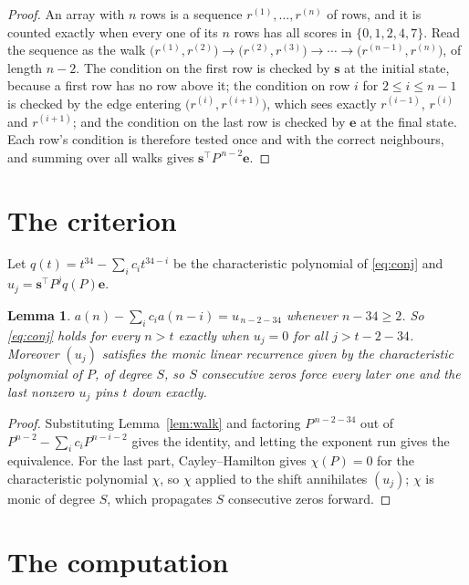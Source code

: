 \documentclass[11pt,a4paper]{article}
\theoremstyle{plain}
\newtheorem{lemma}[theorem]{Lemma}
\theoremstyle{definition}
\begin{document}
\begin{proof}
An array with $n$ rows is a sequence $r^{(1)},\dots,r^{(n)}$ of rows, and it is counted
exactly when every one of its $n$ rows has all scores in $\{0,1,2,4,7\}$. Read the sequence as the
walk $\bigl(r^{(1)},r^{(2)}\bigr)\to\bigl(r^{(2)},r^{(3)}\bigr)\to\cdots\to
\bigl(r^{(n-1)},r^{(n)}\bigr)$, of length $n-2$. The condition on the first row is
checked by $\mathbf{s}$ at the initial state, because a first row has no row above it; the
condition on row $i$ for $2\le i\le n-1$ is checked by the edge entering
$\bigl(r^{(i)},r^{(i+1)}\bigr)$, which sees exactly $r^{(i-1)}$, $r^{(i)}$ and
$r^{(i+1)}$; and the condition on the last row is checked by $\mathbf{e}$ at the final
state. Each row's condition is therefore tested once and with the correct neighbours, and
summing over all walks gives $\mathbf{s}^{\!\top}P^{\,n-2}\mathbf{e}$.
\end{proof}

\section{The criterion}

Let $q(t)=t^{34}-\sum_i c_i t^{34-i}$ be the characteristic polynomial of
\eqref{eq:conj} and $u_j=\mathbf{s}^{\!\top}P^{j}q(P)\mathbf{e}$.

\begin{lemma}\label{lem:crit}
$a(n)-\sum_i c_i a(n-i)=u_{\,n-2-34}$ whenever $n-34\ge2$. So \eqref{eq:conj}
holds for every $n>t$ exactly when $u_j=0$ for all $j>t-2-34$. Moreover $(u_j)$
satisfies the monic linear recurrence given by the characteristic polynomial of $P$, of
degree $S$, so $S$ consecutive zeros force every later one and the last nonzero $u_j$ pins
$t$ down exactly.
\end{lemma}

\begin{proof}
Substituting Lemma~\ref{lem:walk} and factoring $P^{\,n-2-34}$ out of
$P^{n-2}-\sum_i c_i P^{n-i-2}$ gives the identity, and letting the exponent run gives the
equivalence. For the last part, Cayley--Hamilton gives $\chi(P)=0$ for the characteristic
polynomial $\chi$, so $\chi$ applied to the shift annihilates $(u_j)$; $\chi$ is monic of
degree $S$, which propagates $S$ consecutive zeros forward.
\end{proof}

\section{The computation}
\end{document}
